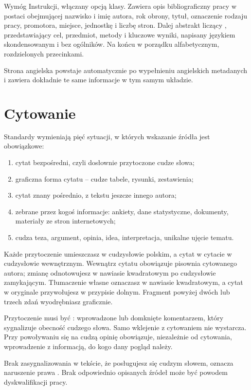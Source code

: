 Wymóg Instrukcji, włączany opcją klasy. Zawiera opis bibliograficzny pracy w postaci obejmującej nazwisko i imię autora, rok obrony, tytuł, oznaczenie rodzaju pracy, promotora, miejsce, jednostkę i liczbę stron. Dalej abstrakt liczący , przedstawiający cel, przedmiot, metody i kluczowe wyniki, napisany językiem skondensowanym i bez ogólników. Na końcu  w porządku alfabetycznym, rozdzielonych przecinkami.

Strona angielska powstaje automatycznie po wypełnieniu angielskich metadanych i zawiera dokładnie te same informacje w tym samym układzie.

\section{Cytowanie}

Standardy wymieniają pięć sytuacji, w których wskazanie źródła jest obowiązkowe:

\begin{enumerate}
\item cytat bezpośredni, czyli dosłownie przytoczone cudze słowa;
\item graficzna forma cytatu -- cudze tabele, rysunki, zestawienia;
\item cytat znany pośrednio, z tekstu jeszcze innego autora;
\item zebrane przez kogoś informacje: ankiety, dane statystyczne, dokumenty, materiały ze stron internetowych;
\item cudza teza, argument, opinia, idea, interpretacja, unikalne ujęcie tematu.
\end{enumerate}

Każde przytoczenie umieszczasz w cudzysłowie polskim, a cytat w cytacie w cudzysłowie wewnętrznym. Wewnątrz cytatu obowiązuje pisownia cytowanego autora; zmianę odnotowujesz w nawiasie kwadratowym po cudzysłowie zamykającym. Tłumaczenie własne oznaczasz w nawiasie kwadratowym, a cytat w oryginale przywołujesz w przypisie dolnym. Fragment powyżej dwóch lub trzech zdań wyodrębniasz graficznie.

Przytoczenie musi być : wprowadzone lub domknięte komentarzem, który sygnalizuje obecność cudzego słowa. Samo wklejenie z cytowaniem nie wystarcza. Przy powoływaniu się na cudzą opinię obowiązuje, niezależnie od cytowania, wprowadzenie z informacją, do kogo dany pogląd należy.

Brak zasygnalizowania w tekście, że posługujesz się cudzym słowem, oznacza naruszenie prawa \parencite{prawoAutorskie}. Brak odpowiednio opisanych źródeł może być powodem dyskwalifikacji pracy.

